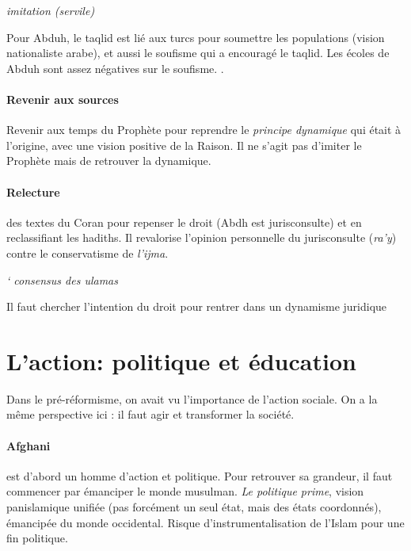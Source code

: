 \begin{Def}[taqlid]
  \emph{ imitation (servile)}
\end{Def} 
Pour Abduh, le taqlid est lié aux turcs pour soumettre les populations (vision nationaliste arabe), et aussi le soufisme qui a encouragé le taqlid. Les écoles de Abduh sont assez négatives sur le soufisme. . 

\paragraph{Revenir aux sources} Revenir aux temps du Prophète pour reprendre le \textit{principe dynamique} qui était à l'origine, avec une vision positive de la Raison. Il ne s'agit pas d'imiter le Prophète mais de retrouver la dynamique. 

\paragraph{Relecture} des textes du Coran pour repenser le droit (Abdh est jurisconsulte) et en reclassifiant les hadiths. Il revalorise l'opinion personnelle du jurisconsulte (\emph{ra'y}) contre le conservatisme de \emph{l'ijma}. 


\begin{Def}[ijma]

\emph{` consensus des ulamas}
\end{Def} 

\begin{Synthesis}
Il faut chercher l'intention du droit pour rentrer dans un dynamisme juridique
\end{Synthesis}



  \section{L'action: politique et éducation} 
 
Dans le pré-réformisme, on avait vu l'importance de l'action sociale. On a la même perspective ici : il faut agir et transformer la société.

\paragraph{Afghani} est d'abord un homme d'action et politique. Pour retrouver sa grandeur, il faut commencer par émanciper le monde musulman. \textit{Le politique prime}, vision panislamique unifiée (pas forcément un seul état, mais des états coordonnés), émancipée du monde occidental. Risque d'instrumentalisation de l'Islam pour une fin politique.


